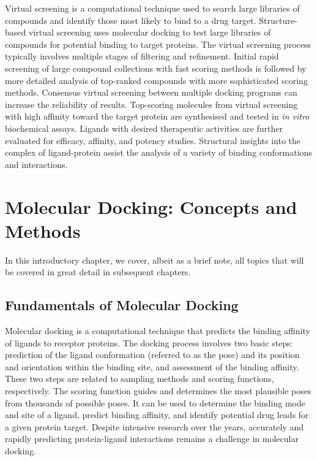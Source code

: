 \documentclass[12pt]{article}
\begin{document}
Virtual screening is a computational technique used to search large libraries of compounds and identify those most likely to bind to a drug target. Structure-based virtual screening uses molecular docking to test large libraries of compounds for potential binding to target proteins. The virtual screening process typically involves multiple stages of filtering and refinement. Initial rapid screening of large compound collections with fast scoring methods is followed by more detailed analysis of top-ranked compounds with more sophisticated scoring methods. Consensus virtual screening between multiple docking programs can increase the reliability of results. Top-scoring molecules from virtual screening with high affinity toward the target protein are synthesised and tested in \textit{in vitro} biochemical assays. Ligands with desired therapeutic activities are further evaluated for efficacy, affinity, and potency studies. Structural insights into the complex of ligand-protein assist the analysis of a variety of binding conformations and interactions.





\section{Molecular Docking: Concepts and Methods}

In this introductory chapter, we cover, albeit as a brief note, all topics that will be covered in great detail in subsequent chapters.



\subsection{Fundamentals of Molecular Docking}

Molecular docking is a computational technique that predicts the binding affinity of ligands to receptor proteins. The docking process involves two basic steps: prediction of the ligand conformation (referred to as the pose) and its position and orientation within the binding site, and assessment of the binding affinity. These two steps are related to sampling methods and scoring functions, respectively. The scoring function guides and determines the most plausible poses from thousands of possible poses. It can be used to determine the binding mode and site of a ligand, predict binding affinity, and identify potential drug leads for a given protein target. Despite intensive research over the years, accurately and rapidly predicting protein-ligand interactions remains a challenge in molecular docking.
\end{document}
